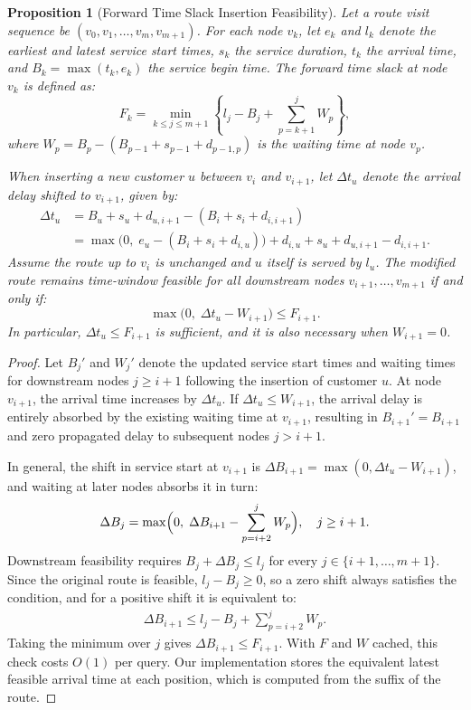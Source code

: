 \documentclass{article}
\newtheorem{proposition}{Proposition}
\begin{document}
\begin{proposition}[Forward Time Slack Insertion Feasibility]
Let a route visit sequence be $(v_0, v_1, \dots, v_m, v_{m+1})$. For each node $v_k$, let $e_k$ and $l_k$ denote the earliest and latest service start times, $s_k$ the service duration, $t_k$ the arrival time, and $B_k = \max(t_k, e_k)$ the service begin time. The forward time slack at node $v_k$ is defined as:
\begin{equation}
F_k = \min_{k \le j \le m+1} \left\{ l_j - B_j + \sum_{p=k+1}^j W_p \right\},
\end{equation}
where $W_p = B_p - (B_{p-1} + s_{p-1} + d_{p-1, p})$ is the waiting time at node $v_p$.

When inserting a new customer $u$ between $v_i$ and $v_{i+1}$, let $\Delta t_u$ denote the arrival delay shifted to $v_{i+1}$, given by:
\begin{align}
\Delta t_u &= B_u + s_u + d_{u, i+1} - (B_i + s_i + d_{i, i+1}) \nonumber \\
&= \max\bigl(0, \; e_u - (B_i + s_i + d_{i, u})\bigr) + d_{i, u} + s_u + d_{u, i+1} - d_{i, i+1}.
\end{align}
Assume the route up to $v_i$ is unchanged and $u$ itself is served by $l_u$. The modified route remains time-window feasible for all downstream nodes $v_{i+1}, \dots, v_{m+1}$ if and only if:
\begin{equation}
\max\bigl(0, \; \Delta t_u - W_{i+1}\bigr) \le F_{i+1}.
\end{equation}
In particular, $\Delta t_u \le F_{i+1}$ is sufficient, and it is also necessary when $W_{i+1} = 0$.
\end{proposition}

\begin{proof}
Let $B_j'$ and $W_j'$ denote the updated service start times and waiting times for downstream nodes $j \ge i+1$ following the insertion of customer $u$.
At node $v_{i+1}$, the arrival time increases by $\Delta t_u$. If $\Delta t_u \le W_{i+1}$, the arrival delay is entirely absorbed by the existing waiting time at $v_{i+1}$, resulting in $B_{i+1}' = B_{i+1}$ and zero propagated delay to subsequent nodes $j > i+1$.

In general, the shift in service start at $v_{i+1}$ is $\Delta B_{i+1} = \max(0, \Delta t_u - W_{i+1})$, and waiting at later nodes absorbs it in turn:
\begin{equation}
\Delta B_j = \max\Bigl(0, \; \Delta B_{i+1} - \sum_{p=i+2}^j W_p \Bigr), \quad j \ge i+1.
\end{equation}
Downstream feasibility requires $B_j + \Delta B_j \le l_j$ for every $j \in \{i+1, \dots, m+1\}$. Since the original route is feasible, $l_j - B_j \ge 0$, so a zero shift always satisfies the condition, and for a positive shift it is equivalent to:
\begin{align}
\Delta B_{i+1} \le l_j - B_j + \sum_{p=i+2}^j W_p.
\end{align}
Taking the minimum over $j$ gives $\Delta B_{i+1} \le F_{i+1}$. With $F$ and $W$ cached, this check costs $O(1)$ per query. Our implementation stores the equivalent latest feasible arrival time at each position, which is computed from the suffix of the route.
\end{proof}
\end{document}
